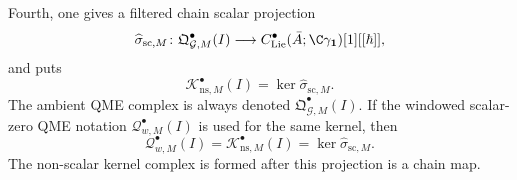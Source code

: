 \begin{defn}
  Fourth, one gives a filtered chain scalar projection
  \[
    \widehat\sigma_{\mathrm{sc},M}\colon
    \mathfrak Q^\bullet_{\mathcal G,M}(I)
      \longrightarrow
    C^\bullet_{\mathrm{Lie}}(\bar A;\C\gamma_{\mathbf 1})[1][[\hbar]],
  \]
  and puts
  \[
    \mathcal K^\bullet_{\mathrm{ns},M}(I)
      =
    \ker\widehat\sigma_{\mathrm{sc},M}.
  \]
  The ambient QME complex is always denoted
  \(\mathfrak Q^\bullet_{\mathcal G,M}(I)\).  If the windowed
  scalar-zero QME notation
  \(\mathcal Q^\bullet_{w,M}(I)\) is used for the same kernel, then
  \[
    \mathcal Q^\bullet_{w,M}(I)
      =
    \mathcal K^\bullet_{\mathrm{ns},M}(I)
      =
    \ker\widehat\sigma_{\mathrm{sc},M}.
  \]
  The non-scalar kernel complex is formed after this projection is a
  chain map.
\end{defn}

